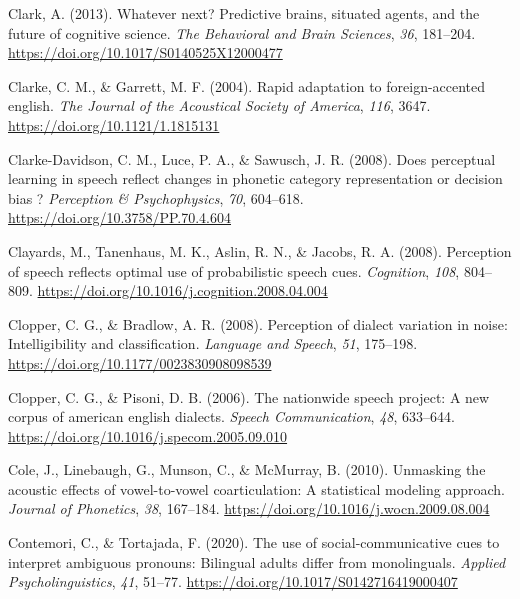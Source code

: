 \documentclass[
  11pt,
  english,
  man,floatsintext]{apa6}
\newlength{\cslhangindent}
\newlength{\cslentryspacingunit} %
\newenvironment{CSLReferences}[2] %
 {%
  \setlength{\parindent}{0pt}
  \ifodd #1
  \let\oldpar\par
  \def\par{\hangindent=\cslhangindent\oldpar}
  \fi
  \setlength{\parskip}{#2\cslentryspacingunit}
 }%
 {}
\begin{document}
\begin{CSLReferences}{1}{0}
\leavevmode{}%
Clark, A. (2013). Whatever next? Predictive brains, situated agents, and the future of cognitive science. \emph{The Behavioral and Brain Sciences}, \emph{36}, 181--204. \url{https://doi.org/10.1017/S0140525X12000477}

\leavevmode{}%
Clarke, C. M., \& Garrett, M. F. (2004). Rapid adaptation to foreign-accented english. \emph{The Journal of the Acoustical Society of America}, \emph{116}, 3647. \url{https://doi.org/10.1121/1.1815131}

\leavevmode{}%
Clarke-Davidson, C. M., Luce, P. A., \& Sawusch, J. R. (2008). Does perceptual learning in speech reflect changes in phonetic category representation or decision bias ? \emph{Perception \& Psychophysics}, \emph{70}, 604--618. \url{https://doi.org/10.3758/PP.70.4.604}

\leavevmode{}%
Clayards, M., Tanenhaus, M. K., Aslin, R. N., \& Jacobs, R. A. (2008). Perception of speech reflects optimal use of probabilistic speech cues. \emph{Cognition}, \emph{108}, 804--809. \url{https://doi.org/10.1016/j.cognition.2008.04.004}

\leavevmode{}%
Clopper, C. G., \& Bradlow, A. R. (2008). Perception of dialect variation in noise: Intelligibility and classification. \emph{Language and Speech}, \emph{51}, 175--198. \url{https://doi.org/10.1177/0023830908098539}

\leavevmode{}%
Clopper, C. G., \& Pisoni, D. B. (2006). The nationwide speech project: A new corpus of american english dialects. \emph{Speech Communication}, \emph{48}, 633--644. \url{https://doi.org/10.1016/j.specom.2005.09.010}

\leavevmode{}%
Cole, J., Linebaugh, G., Munson, C., \& McMurray, B. (2010). Unmasking the acoustic effects of vowel-to-vowel coarticulation: A statistical modeling approach. \emph{Journal of Phonetics}, \emph{38}, 167--184. \url{https://doi.org/10.1016/j.wocn.2009.08.004}

\leavevmode{}%
Contemori, C., \& Tortajada, F. (2020). The use of social-communicative cues to interpret ambiguous pronouns: Bilingual adults differ from monolinguals. \emph{Applied Psycholinguistics}, \emph{41}, 51--77. \url{https://doi.org/10.1017/S0142716419000407}


\end{CSLReferences}
\end{document}
